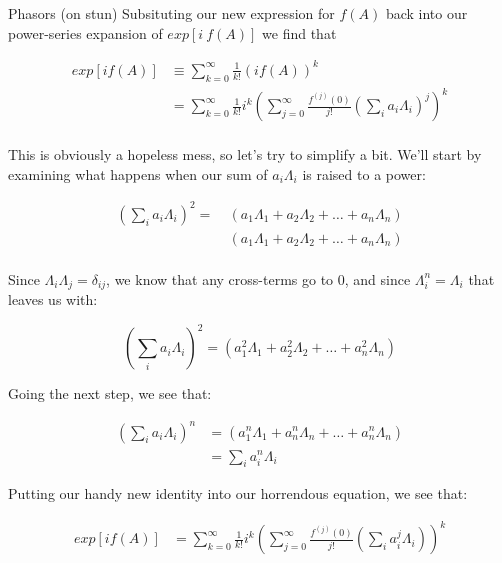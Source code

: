 \begin{answer}
\begin{answerpart}{Phasors (on stun)}
  Subsituting our new expression for $f(A)$ back into our power-series
  expansion of $exp[i\ f(A)]$ we find that

  \begin{equation}
    \begin{split}
      exp[if(A)]
      &\equiv \sum_{k=0}^{\infty} \frac{1}{k!} (if(A))^k\\
      &= \sum_{k=0}^{\infty} \frac{1}{k!} i^k\left(\sum_{j=0}^{\infty} \frac{f^{(j)}(0)}{j!} \left(\sum_i a_i\Lambda_i\right)^j\right)^k\\
    \end{split}
  \end{equation}

  This is obviously a hopeless mess, so let's try to simplify a bit.
  We'll start by examining what happens when our sum of $a_i\Lambda_i$
  is raised to a power:

  \begin{equation}
    \begin{split}
      \left(\sum_i a_i\Lambda_i\right)^2 =\ 
      &(a_1\Lambda_1 + a_2\Lambda_2 + \ldots + a_n\Lambda_n)\\
      &(a_1\Lambda_1 + a_2\Lambda_2 + \ldots + a_n\Lambda_n)\\
    \end{split}
  \end{equation}

  Since $\Lambda_i\Lambda_j = \delta_{ij}$, we know that any
  cross-terms go to 0, and since $\Lambda_i^n = \Lambda_i$ that leaves
  us with:
  
  \begin{equation}
    \left(\sum_i a_i\Lambda_i\right)^2 = (a_1^2\Lambda_1 + a_2^2\Lambda_2 + \ldots + a_n^2\Lambda_n)
  \end{equation}

  Going the next step, we see that:

  \begin{equation}
    \begin{split}
      \left(\sum_i a_i\Lambda_i\right)^n
      &= (a_1^n\Lambda_1 + a_n^n\Lambda_n + \ldots + a_n^n\Lambda_n)\\
      &= \sum_i a_i^n\Lambda_i
    \end{split}
  \end{equation}
  
  Putting our handy new identity into our horrendous equation, we see
  that:

  \begin{equation}
    \begin{split}
      exp[if(A)]
      &= \sum_{k=0}^{\infty} \frac{1}{k!} i^k\left(\sum_{j=0}^{\infty} \frac{f^{(j)}(0)}{j!} \left(\sum_i a_i^j\Lambda_i\right)\right)^k\\
    \end{split}
  \end{equation}


\end{answerpart}
\end{answer}
